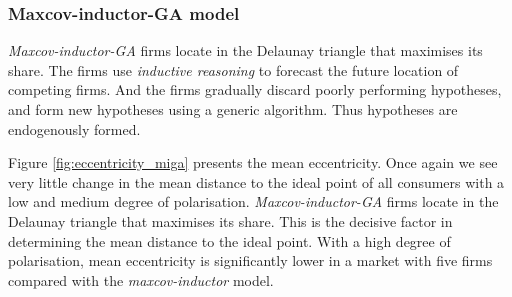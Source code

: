 \documentclass[preprint, 12pt]{elsarticle}
\begin{document}
\subsubsection{Maxcov-inductor-GA model}

\emph{Maxcov-inductor-GA} firms locate in the Delaunay triangle that maximises its share. The firms use \emph{inductive reasoning} to forecast the future location of competing firms. And the firms gradually discard poorly performing hypotheses, and form new hypotheses using a generic algorithm. Thus hypotheses are endogenously formed.

Figure \ref{fig:eccentricity_miga} presents the mean eccentricity. Once again we see very little change in the mean distance to the ideal point of all consumers with a low and medium degree of polarisation. \emph{Maxcov-inductor-GA} firms locate in the Delaunay triangle that maximises its share. This is the decisive factor in determining the mean distance to the ideal point. With a high degree of polarisation, mean eccentricity is significantly lower in a market with five firms compared with the \emph{maxcov-inductor} model.
\end{document}
